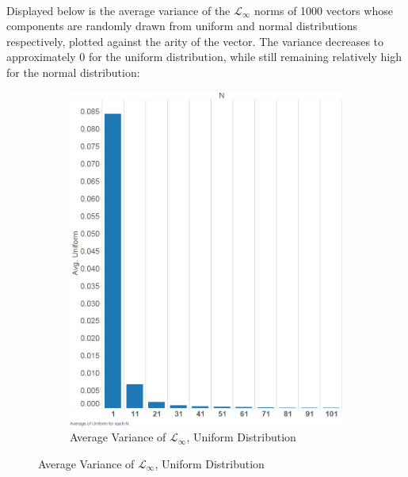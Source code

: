 \documentclass{article}
\begin{document}
\paragraph{}
Displayed below is the average variance of the $\mathcal{L}_{\infty}$ norms of 1000 vectors whose components are randomly drawn from uniform and normal distributions respectively, plotted against the arity of the vector.  The variance decreases to approximately 0 for the uniform distribution, while still remaining relatively high for the normal distribution:
\begin{figure}[H]
\centering
\begin{subfigure}[h]{0.7\textwidth}
        \includegraphics[width=.75\textwidth]{exp2-var-uniform.png}
        \caption{Average Variance of $\mathcal{L}_{\infty}$, Uniform Distribution}
        \label{fig:exp2varuniform}
\end{subfigure}
\end{figure}
\end{document}
